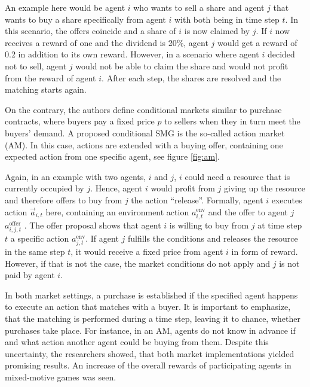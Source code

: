 An example here would be agent $i$ who wants to sell a share and agent $j$ that wants to buy a share specifically from agent $i$ with both being in time step $t$. In this scenario, the offers coincide and a share of $i$ is now claimed by $j$. If $i$ now receives a reward of one and the dividend is 20\%, agent $j$ would get a reward of 0.2 in addition to its own reward. However, in a scenario where agent $i$ decided not to sell, agent $j$ would not be able to claim the share and would not profit from the reward of agent $i$. After each step, the shares are resolved and the matching starts again.

On the contrary, the authors define conditional markets similar to purchase contracts, where buyers pay a fixed price $p$ to sellers when they in turn meet the buyers' demand. A proposed conditional SMG is the so-called action market (AM). In this case, actions are extended with a buying offer, containing one expected action from one specific agent, see figure \ref{fig:am}.

Again, in an example with two agents, $i$ and $j$, $i$ could need a resource that is currently occupied by $j$. Hence, agent $i$ would profit from $j$ giving up the resource and therefore offers to buy from $j$ the action ``release''. Formally, agent $i$ executes action $\overrightarrow{a}_{i,t}$ here, containing an environment action $a^{\text{env}}_{i,t}$ and the offer to agent $j$ $a^{\text{offer}}_{i,j,t}$ \cite{scbe21}. The offer proposal shows that agent $i$ is willing to buy from $j$ at time step $t$ a specific action $a^{\text{env}}_{j,t}$. If agent $j$ fulfills the conditions and releases the resource in the same step $t$, it would receive a fixed price from agent $i$ in form of reward. However, if that is not the case, the market conditions do not apply and $j$ is not paid by agent $i$.

In both market settings, a purchase is established if the specified agent happens to execute an action that matches with a buyer. It is important to emphasize, that the matching is performed during a time step, leaving it to chance, whether purchases take place. For instance, in an AM, agents do not know in advance if and what action another agent could be buying from them. Despite this uncertainty, the researchers showed, that both market implementations yielded promising results. An increase of the overall rewards of participating agents in mixed-motive games was seen.

